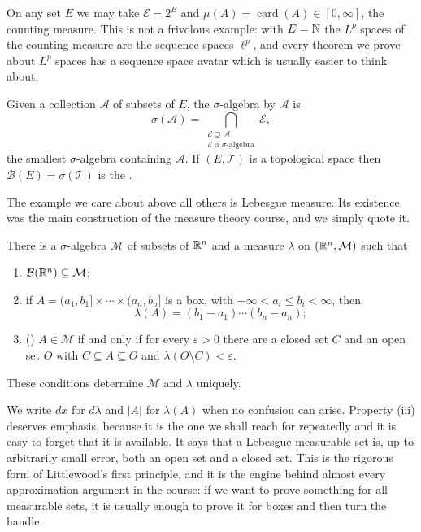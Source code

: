 \documentclass[a4paper]{scrartcl}
\DeclareMathOperator{\card}{card}
\begin{document}
\begin{example}
	On any set $E$ we may take $\mathcal{E} = 2^E$ and $\mu(A) = \card(A) \in [0,\infty]$, the counting measure. This is not a frivolous example: with $E = \mathbb{N}$ the $L^p$ spaces of the counting measure are the sequence spaces $\ell^p$, and every theorem we prove about $L^p$ spaces has a sequence space avatar which is usually easier to think about.
\end{example}

\begin{definition}
	Given a collection $\mathcal{A}$ of subsets of $E$, the $\sigma$-algebra  by $\mathcal{A}$ is
	$$\sigma(\mathcal{A}) = \bigcap_{\substack{\mathcal{E} \supseteq \mathcal{A} \\ \mathcal{E} \text{ a $\sigma$-algebra}}} \mathcal{E},$$
	the smallest $\sigma$-algebra containing $\mathcal{A}$. If $(E, \mathcal{T})$ is a topological space then $\mathcal{B}(E) = \sigma(\mathcal{T})$ is the .
\end{definition}

The example we care about above all others is Lebesgue measure. Its existence was the main construction of the measure theory course, and we simply quote it.

\begin{theorem}\label{aof-thm:lebesgue}
	There is a $\sigma$-algebra $\mathcal{M}$ of subsets of $\mathbb{R}^n$ and a measure $\lambda$ on $(\mathbb{R}^n, \mathcal{M})$ such that
	\begin{enumerate}[label=(\roman*)]
		\item $\mathcal{B}(\mathbb{R}^n) \subseteq \mathcal{M}$;
		\item if $A = (a_1, b_1] \times \cdots \times (a_n, b_n]$ is a box, with $-\infty < a_i \le b_i < \infty$, then
		$$\lambda(A) = (b_1 - a_1) \cdots (b_n - a_n);$$
		\item () $A \in \mathcal{M}$ if and only if for every $\varepsilon > 0$ there are a closed set $C$ and an open set $O$ with $C \subseteq A \subseteq O$ and $\lambda(O \setminus C) < \varepsilon$.
	\end{enumerate}
	These conditions determine $\mathcal{M}$ and $\lambda$ uniquely.
\end{theorem}

We write $dx$ for $d\lambda$ and $|A|$ for $\lambda(A)$ when no confusion can arise. Property (iii) deserves emphasis, because it is the one we shall reach for repeatedly and it is easy to forget that it is available. It says that a Lebesgue measurable set is, up to arbitrarily small error, both an open set and a closed set. This is the rigorous form of Littlewood's first principle, and it is the engine behind almost every approximation argument in the course: if we want to prove something for all measurable sets, it is usually enough to prove it for boxes and then turn the handle.
\end{document}

